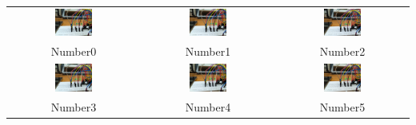 \documentclass[a4paper,12pt]{article}
\begin{document}
\begin{table}[H]
    \centering
    \begin{tabular}{ccc} %
        \includegraphics[width=0.3\textwidth]{figs/0.jpeg} & 
        \includegraphics[width=0.3\textwidth]{figs/1.jpeg} & 
        \includegraphics[width=0.3\textwidth]{figs/2.jpeg} \\ 
        Number0 & Number1 & Number2 \\
        
        \includegraphics[width=0.3\textwidth]{figs/3.jpeg} & 
        \includegraphics[width=0.3\textwidth]{figs/4.jpeg} & 
        \includegraphics[width=0.3\textwidth]{figs/5.jpeg} \\ 
        Number3 & Number4 & Number5 \\
        

\end{tabular}
\end{table}
\end{document}
